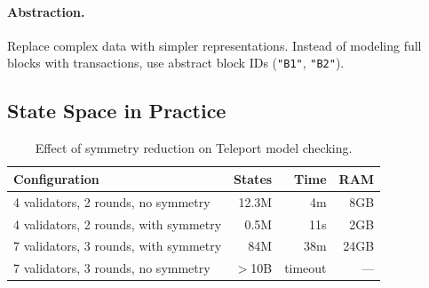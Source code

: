 \paragraph{Abstraction.}
Replace complex data with simpler representations. Instead of modeling full blocks
with transactions, use abstract block IDs (\texttt{"B1"}, \texttt{"B2"}).

\subsection{State Space in Practice}

\begin{table}[H]
\centering
\small
\begin{tabular}{@{}lrrr@{}}
\toprule
\textbf{Configuration} & \textbf{States} & \textbf{Time} & \textbf{RAM} \\
\midrule
4 validators, 2 rounds, no symmetry & 12.3M & 4m & 8GB \\
4 validators, 2 rounds, with symmetry & 0.5M & 11s & 2GB \\
7 validators, 3 rounds, with symmetry & 84M & 38m & 24GB \\
7 validators, 3 rounds, no symmetry & $>$10B & timeout & --- \\
\bottomrule
\end{tabular}
\caption{Effect of symmetry reduction on Teleport model checking.}
\end{table}

